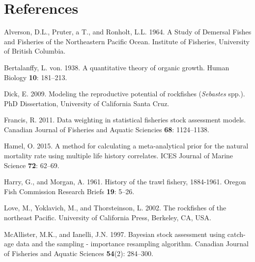 \documentclass[12pt,]{article}
\begin{document}
\FloatBarrier

\FloatBarrier

\FloatBarrier

\FloatBarrier

\FloatBarrier

\FloatBarrier

\FloatBarrier

\newpage

\color{black}

\section*{References}\label{references}

\renewcommand{\thepage}{}

\hypertarget{refs}{}
\hypertarget{ref-Alverson1964}{}
Alverson, D.L., Pruter, a T., and Ronholt, L.L. 1964. A Study of
Demersal Fishes and Fisheries of the Northeastern Pacific Ocean.
Institute of Fisheries, University of British Columbia.

\hypertarget{ref-vonB1938}{}
Bertalanffy, L. von. 1938. A quantitative theory of organic growth.
Human Biology \textbf{10}: 181--213.

\hypertarget{ref-Dick2009}{}
Dick, E. 2009. Modeling the reproductive potential of rockfishes
(\emph{Sebastes} spp.). PhD Dissertation, University of California Santa
Cruz.

\hypertarget{ref-Francis2011}{}
Francis, R. 2011. Data weighting in statistical fisheries stock
assessment models. Canadian Journal of Fisheries and Aquatic Sciencies
\textbf{68}: 1124--1138.

\hypertarget{ref-Hamel2015}{}
Hamel, O. 2015. A method for calculating a meta-analytical prior for the
natural mortality rate using multiple life history correlates. ICES
Journal of Marine Science \textbf{72}: 62--69.

\hypertarget{ref-Harry1961}{}
Harry, G., and Morgan, A. 1961. History of the trawl fishery, 1884-1961.
Oregon Fish Commission Research Briefs \textbf{19}: 5--26.

\hypertarget{ref-Love2002}{}
Love, M., Yoklavich, M., and Thorsteinson, L. 2002. The rockfishes of
the northeast Pacific. University of California Press, Berkeley, CA,
USA.

\hypertarget{ref-McAllister1997}{}
McAllister, M.K., and Ianelli, J.N. 1997. Bayesian stock assessment
using catch-age data and the sampling - importance resampling algorithm.
Canadian Journal of Fisheries and Aquatic Sciences \textbf{54}(2):
284--300.
\end{document}
